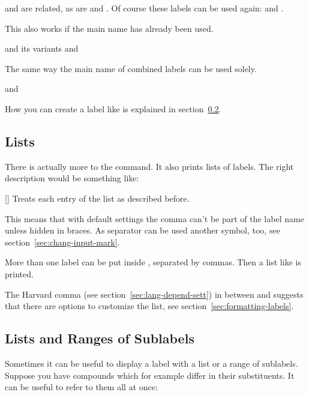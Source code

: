 \documentclass[load-preamble+,babel-options={ngerman,british,american}]{cnltx-doc}
\begin{document}
\begin{example}
   and  are related, as are  and
  .  Of course these labels can be used again:  and
  .
\end{example}

This also works if the main name has already been used.
\begin{example}
   and its variants  and 
\end{example}

The same way the main name of combined labels can be used solely.
\begin{example}
   and 
\end{example}

How you can create a label like  is explained in
section~\ref{sec:lists-rang-subl}.

\subsection{Lists}\label{sec:lists}
There is actually more to the  command.  It also prints lists of
labels.  The right description would be something like:
\begin{commands}
  []
    Treats each entry of the list as described before.
\end{commands}
This means that with default settings the comma can't be part of the label
name unless hidden in braces.  As separator can be used another symbol, too,
see section~\ref{sec:chang-input-mark}.

\begin{example}
  More than one label can be put inside , separated by commas.  Then
  a list like  is printed.
\end{example}
The Harvard comma (see section~\ref{sec:lang-depend-sett}) in 
between  and  suggests that there are options to customize
the list, see section~\ref{sec:formatting-labels}.

\subsection{Lists and Ranges of Sublabels}\label{sec:lists-rang-subl}
Sometimes it can be useful to display a label with a list or a range of
sublabels.  Suppose you have compounds
 which for example differ in their
substituents.  It can be useful to refer to them all at once:
\end{document}
